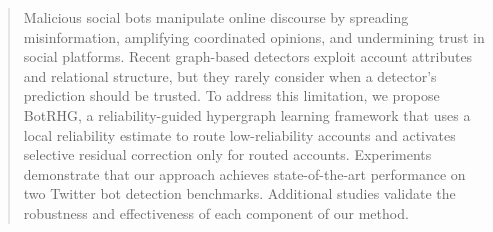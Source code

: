 \begin{abstract}
Malicious social bots manipulate online discourse by spreading misinformation, amplifying coordinated opinions, and undermining trust in social platforms. Recent graph-based detectors exploit account attributes and relational structure, but they rarely consider when a detector's prediction should be trusted. To address this limitation, we propose BotRHG, a reliability-guided hypergraph learning framework that uses a local reliability estimate to route low-reliability accounts and activates selective residual correction only for routed accounts. Experiments demonstrate that our approach achieves state-of-the-art performance on two Twitter bot detection benchmarks. Additional studies validate the robustness and effectiveness of each component of our method.

\end{abstract}
